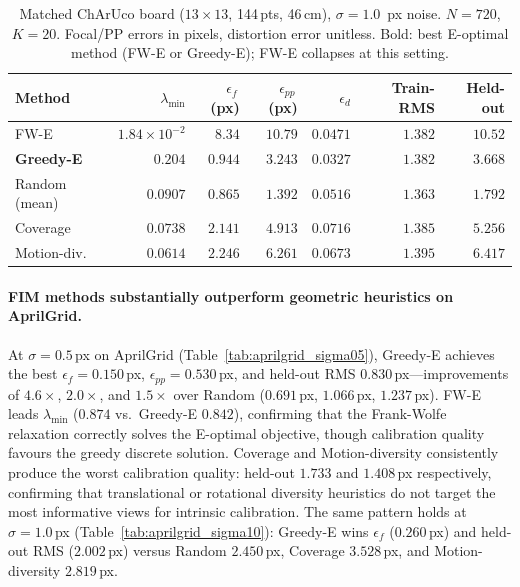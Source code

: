 \documentclass[11pt]{article}
\begin{document}
\begin{table}[ht]
\centering
\setlength{\tabcolsep}{4pt}
\caption{Matched ChArUco board ($13{\times}13$, 144\,pts, 46\,cm), $\sigma{=}1.0$~px noise. $N{=}720$, $K{=}20$.
Focal/PP errors in pixels, distortion error unitless. Bold: best E-optimal method (FW-E or Greedy-E); FW-E collapses at this setting.}
\label{tab:charuco_sigma10}
\begin{tabular}{lrrrrrr}
\toprule
Method & $\lambda_{\min}$ & $\epsilon_f$\,(px) & $\epsilon_{pp}$\,(px) & $\epsilon_d$ & Train-RMS & Held-out \\
\midrule
FW-E              & $1.84\!\times\!10^{-2}$ & $8.34$ & $10.79$ & $0.0471$ & $\mathbf{1.382}$ & $10.52$ \\
\textbf{Greedy-E} & $\mathbf{0.204}$ & $\mathbf{0.944}$ & $\mathbf{3.243}$ & $\mathbf{0.0327}$ & $\mathbf{1.382}$ & $\mathbf{3.668}$ \\
Random (mean)     & $0.0907$ & $0.865$ & $1.392$ & $0.0516$ & $1.363$ & $1.792$ \\
Coverage          & $0.0738$ & $2.141$ & $4.913$ & $0.0716$ & $1.385$ & $5.256$ \\
Motion-div.       & $0.0614$ & $2.246$ & $6.261$ & $0.0673$ & $1.395$ & $6.417$ \\
\bottomrule
\end{tabular}
\end{table}

\paragraph{FIM methods substantially outperform geometric heuristics on AprilGrid.}
At $\sigma{=}0.5$\,px on AprilGrid (Table~\ref{tab:aprilgrid_sigma05}),
Greedy-E achieves the best $\epsilon_f{=}0.150$\,px, $\epsilon_{pp}{=}0.530$\,px,
and held-out RMS $0.830$\,px---improvements of $4.6{\times}$, $2.0{\times}$,
and $1.5{\times}$ over Random ($0.691$\,px, $1.066$\,px, $1.237$\,px).
FW-E leads $\lambda_{\min}$ ($0.874$ vs.\ Greedy-E $0.842$), confirming that
the Frank-Wolfe relaxation correctly solves the E-optimal objective, though
calibration quality favours the greedy discrete solution.
Coverage and Motion-diversity consistently produce the worst calibration
quality: held-out $1.733$ and $1.408$\,px respectively, confirming that
translational or rotational diversity heuristics do not target the most
informative views for intrinsic calibration.
The same pattern holds at $\sigma{=}1.0$\,px (Table~\ref{tab:aprilgrid_sigma10}):
Greedy-E wins $\epsilon_f$ ($0.260$\,px) and held-out RMS ($2.002$\,px)
versus Random $2.450$\,px, Coverage $3.528$\,px, and Motion-diversity $2.819$\,px.
\end{document}
